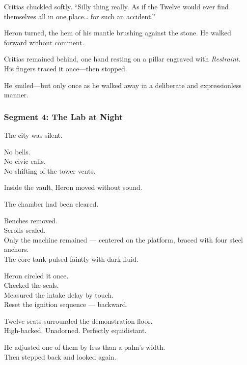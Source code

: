 \documentclass[9pt]{article}
\begin{document}
Critias chuckled softly.  
“Silly thing really. As if the Twelve would ever find themselves all in one place… for such an accident.”

\vspace{1em}

Heron turned, the hem of his mantle brushing against the stone.  
He walked forward without comment.

Critias remained behind, one hand resting on a pillar engraved with \textit{Restraint}.\\
His fingers traced it once—then stopped.

\vspace{1em}

He smiled—but only once as he walked away in a deliberate and expressionless manner.

\newpage

\subsubsection*{Segment 4: The Lab at Night}

The city was silent.

No bells.\\
No civic calls.\\
No shifting of the tower vents.

Inside the vault, Heron moved without sound.

\vspace{1em}

The chamber had been cleared.

Benches removed.\\
Scrolls sealed.\\
Only the machine remained — centered on the platform, braced with four steel anchors.\\
The core tank pulsed faintly with dark fluid.

Heron circled it once.\\
Checked the seals.\\
Measured the intake delay by touch.\\
Reset the ignition sequence — backward.

\vspace{1em}

Twelve seats surrounded the demonstration floor.\\
High-backed. Unadorned. Perfectly equidistant.

He adjusted one of them by less than a palm’s width.\\
Then stepped back and looked again.
\end{document}
